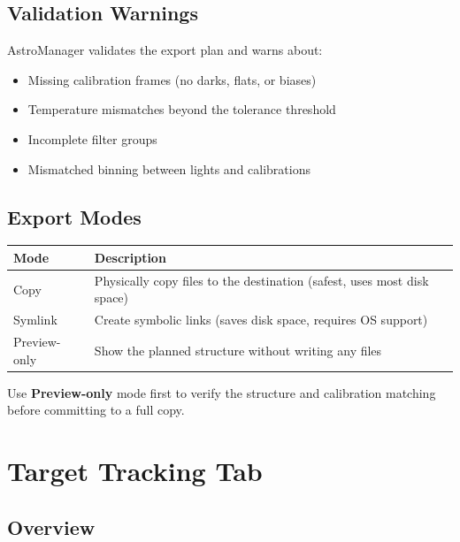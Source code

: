 \documentclass[11pt,a4paper]{article}
\begin{document}
\subsection{Validation Warnings}

AstroManager validates the export plan and warns about:
\begin{itemize}
    \item Missing calibration frames (no darks, flats, or biases)
    \item Temperature mismatches beyond the tolerance threshold
    \item Incomplete filter groups
    \item Mismatched binning between lights and calibrations
\end{itemize}

\subsection{Export Modes}

\begin{center}
\begin{tabular}{lp{9cm}}
\toprule
\textbf{Mode} & \textbf{Description} \\
\midrule
Copy & Physically copy files to the destination (safest, uses most disk space) \\
Symlink & Create symbolic links (saves disk space, requires OS support) \\
Preview-only & Show the planned structure without writing any files \\
\bottomrule
\end{tabular}
\end{center}

\begin{tipbox}
Use \textbf{Preview-only} mode first to verify the structure and calibration matching before committing to a full copy.
\end{tipbox}


\section{Target Tracking Tab}
\label{sec:tracking}

\subsection{Overview}
\end{document}

